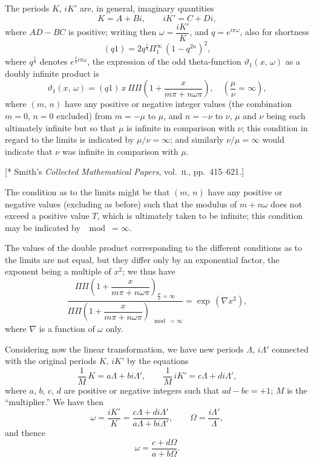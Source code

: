 \documentclass[11pt,a4paper]{book}
\begin{document}
The periods $K$, $iK'$ are, in general, imaginary quantities
\[
K = A + Bi,\qquad iK' = C + Di,
\]
where $AD - BC$ is positive; writing then $\omega = \dfrac{iK'}{K}$, and $q = e^{i\pi\omega}$, also for shortness
\[
(q1) = 2q^{\frac{1}{4}} \Pi_1^{\infty}\,(1-q^{2n})^2,
\]
where $q^{\frac{1}{4}}$ denotes $e^{\frac{1}{4}i\pi\omega}$, the expression of the odd theta-function $\vartheta_1(x,\,\omega)$ as a doubly infinite product is
\[
\vartheta_1(x,\,\omega) = (q1)\,x\,\Pi\Pi\left(1 + \frac{x}{m\pi + n\omega\pi}\right),\quad \left(\frac{\mu}{\nu} = \infty\right),
\]
where $(m,\,n)$ have any positive or negative integer values (the combination $m=0$, $n=0$ excluded) from $m = -\mu$ to $\mu$, and $n = -\nu$ to $\nu$, $\mu$ and $\nu$ being each ultimately infinite but so that $\mu$ is infinite in comparison with $\nu$; this condition in regard to the limits is indicated by $\mu/\nu = \infty$; and similarly $\nu/\mu = \infty$ would indicate that $\nu$ was infinite in comparison with $\mu$.

\begin{flushright}
\small[* Smith's \textit{Collected Mathematical Papers}, vol.~\textsc{ii.}, pp.~415--621.]
\end{flushright}

The condition as to the limits might be that $(m,\,n)$ have any positive or negative values (excluding as before) such that the modulus of $m + n\omega$ does not exceed a positive value $T$, which is ultimately taken to be infinite; this condition may be indicated by $\mod = \infty$.

The values of the double product corresponding to the different conditions as to the limits are not equal, but they differ only by an exponential factor, the exponent being a multiple of $x^2$; we thus have
\[
\frac{\Pi\Pi\left(1 + \dfrac{x}{m\pi + n\omega\pi}\right)_{\frac{\mu}{\nu}=\infty}}{\Pi\Pi\left(1 + \dfrac{x}{m\pi + n\omega\pi}\right)_{\mod=\infty}} = \exp\,(\nabla x^2),
\]
where $\nabla$ is a function of $\omega$ only.

Considering now the linear transformation, we have new periods $\Lambda$, $i\Lambda'$ connected with the original periods $K$, $iK'$ by the equations
\[
\frac{1}{M}\,K = a\Lambda + bi\Lambda',\qquad \frac{1}{M}\,iK' = c\Lambda + di\Lambda',
\]
where $a$, $b$, $c$, $d$ are positive or negative integers such that $ad - bc = +1$; $M$ is the ``multiplier.'' We have then
\[
\omega = \frac{iK'}{K} = \frac{c\Lambda + di\Lambda'}{a\Lambda + bi\Lambda'},\qquad \Omega = \frac{i\Lambda'}{\Lambda},
\]
and thence
\[
\omega = \frac{c + d\Omega}{a + b\Omega}.
\]
\end{document}
